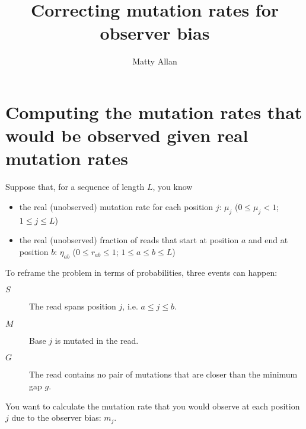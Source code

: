\documentclass[12pt,a4paper]{article}
\title{Correcting mutation rates for observer bias}
\author{Matty Allan}
\begin{document}
\maketitle


\section*{Computing the mutation rates that would be observed given real mutation rates}

Suppose that, for a sequence of length $L$, you know

\begin{itemize}
\item{the real (unobserved) mutation rate for each position $j$: $\mu_j$ ($0 \le \mu_j < 1$; $1 \le j \le L$)}
\item{the real (unobserved) fraction of reads that start at position $a$ and end at position $b$: $\eta_{ab}$ ($0 \le r_{ab} \le 1$; $1 \le a \le b \le L$)}
\end{itemize}

To reframe the problem in terms of probabilities, three events can happen:

\begin{description}
\item[$S$]{The read spans position $j$, i.e. $a \le j \le b$.}
\item[$M$]{Base $j$ is mutated in the read.}
\item[$G$]{The read contains no pair of mutations that are closer than the minimum gap $g$.}
\end{description}


You want to calculate the mutation rate that you would observe at each position $j$ due to the observer bias: $m_j$.
\end{document}
